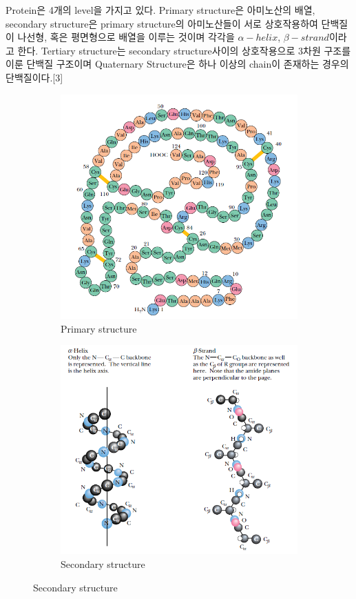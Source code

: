 \documentclass[%
 reprint,
 amsmath,amssymb,
 aps,
]{revtex4-2}
\begin{document}
Protein은 4개의 level을 가지고 있다. Primary structure은 아미노산의 배열, secondary structure은 primary structure의 아미노산들이 서로 상호작용하여 단백질이 나선형, 혹은 평면형으로 배열을 이루는 것이며 각각을 $\alpha-helix$, $\beta-strand$이라고 한다. Tertiary structure는 secondary structure사이의 상호작용으로 3차원 구조를 이룬 단백질 구조이며 Quaternary Structure은 하나 이상의 chain이 존재하는 경우의 단백질이다.[3]
\begin{figure}[htbp]
	\begin{subfigure}{0.4\textwidth}
		\includegraphics[width = 0.5\linewidth]{First.png}%
		\caption{\label{fig:First}Primary structure}
	\end{subfigure}
	\begin{subfigure}{0.4\textwidth}
		\includegraphics[width = 0.5\linewidth]{Second.png}%
		\caption{\label{fig:Second}Secondary structure}
	\end{subfigure}


\end{figure}
\end{document}
